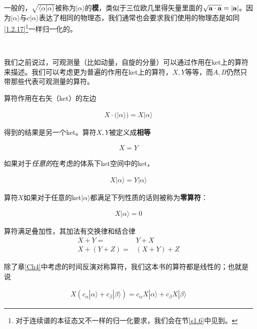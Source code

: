 \documentclass[UTF8,twoside]{ctexart}
\begin{document}
\noindent 一般的，$\sqrt{\langle\alpha|\alpha\rangle}$被称为$|\alpha\rangle$的{\bf 模}，类似于三位欧几里得矢量里面的$\sqrt{\bf a\cdot a} = |\bf a|$。因为$|\alpha\rangle$与$c|\alpha\rangle$表达了相同的物理态，我们通常也会要求我们使用的物理态是如同\eqref{1.2.17}\footnote{对于连续谱的本征态又不一样的归一化要求，我们会在节\ref{s1.6}中见到。}一样归一化的。

\ 


\noindent 我们之前说过，可观测量（比如动量，自旋的分量）可以通过作用在ket上的算符来描述。我们可以考虑更为普遍的作用在ket上的算符，$X, Y$等等，而$A,B$仍然只带那些代表可观测量的算符。

算符作用在右矢（ket）的左边

\begin{align}
X\cdot(|\alpha\rangle)=X|\alpha\rangle
\end{align}

\noindent 得到的结果是另一个ket。算符$X, Y$被定义成{\bf 相等}

\begin{align}
X=Y
\end{align}

\noindent 如果对于{\emph{任意的}}在考虑的体系下ket空间中的ket，

\begin{align}
X|\alpha\rangle = Y|\alpha\rangle
\end{align}

\noindent 算符$X$如果对于任意的ket$|\alpha\rangle$都满足下列性质的话则被称为{\bf 零算符}：

\begin{align}
X|\alpha\rangle = 0
\end{align}

\noindent 算符满足叠加性，其加法有交换律和结合律
\setcounter{equation}{20}
\begin{subequations}
\begin{align}
X+Y=&Y+X\\
X+(Y+Z)=&(X+Y)+Z
\end{align}
\end{subequations}

\noindent 除了章{\ref{Ch4}}中考虑的时间反演对称算符，我们这本书的算符都是线性的；也就是说

\begin{align}
X(c_\alpha|\alpha\rangle+c_\beta|\beta\rangle)=c_\alpha X|\alpha\rangle + c_\beta X|\beta\rangle
\end{align}
\end{document}
